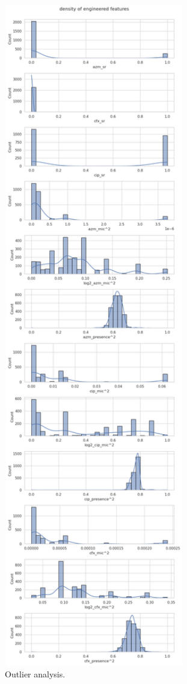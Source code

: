 \documentclass[manuscript,screen,review, nonacm]{acmart}
\begin{document}
\begin{itemize}
         \begin{figure}[H]
            \centering
            \vspace{-10pt}
            \includegraphics[width=0.7\textwidth]{figures/polydensity.png}
            \caption{Outlier analysis.}
            \vspace{-10pt}
        \end{figure}
    

\end{itemize}
\end{document}
